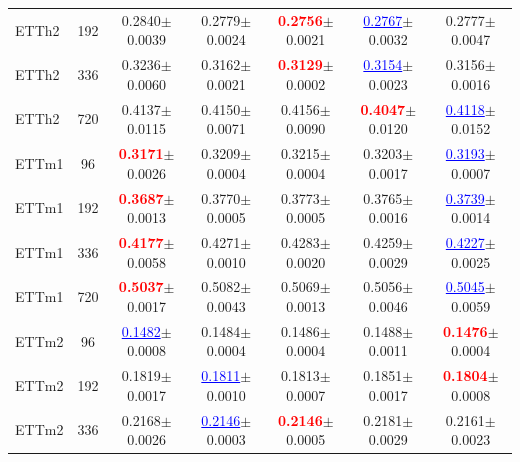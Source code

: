 \begin{table}[h]
\begin{center}
\begin{tabular}{l|c|ccccc}
    ETTh2 & 192 & 0.2840{\scriptsize $\pm$0.0039} & 0.2779{\scriptsize $\pm$0.0024} & \textcolor{red}{\textbf{0.2756}}{\scriptsize $\pm$0.0021} & \textcolor{blue}{\underline{0.2767}}{\scriptsize $\pm$0.0032} & 0.2777{\scriptsize $\pm$0.0047} \\
    ETTh2 & 336 & 0.3236{\scriptsize $\pm$0.0060} & 0.3162{\scriptsize $\pm$0.0021} & \textcolor{red}{\textbf{0.3129}}{\scriptsize $\pm$0.0002} & \textcolor{blue}{\underline{0.3154}}{\scriptsize $\pm$0.0023} & 0.3156{\scriptsize $\pm$0.0016} \\
    ETTh2 & 720 & 0.4137{\scriptsize $\pm$0.0115} & 0.4150{\scriptsize $\pm$0.0071} & 0.4156{\scriptsize $\pm$0.0090} & \textcolor{red}{\textbf{0.4047}}{\scriptsize $\pm$0.0120} & \textcolor{blue}{\underline{0.4118}}{\scriptsize $\pm$0.0152} \\
    \midrule
    ETTm1 & 96  & \textcolor{red}{\textbf{0.3171}}{\scriptsize $\pm$0.0026} & 0.3209{\scriptsize $\pm$0.0004} & 0.3215{\scriptsize $\pm$0.0004} & 0.3203{\scriptsize $\pm$0.0017} & \textcolor{blue}{\underline{0.3193}}{\scriptsize $\pm$0.0007} \\
    ETTm1 & 192 & \textcolor{red}{\textbf{0.3687}}{\scriptsize $\pm$0.0013} & 0.3770{\scriptsize $\pm$0.0005} & 0.3773{\scriptsize $\pm$0.0005} & 0.3765{\scriptsize $\pm$0.0016} & \textcolor{blue}{\underline{0.3739}}{\scriptsize $\pm$0.0014} \\
    ETTm1 & 336 & \textcolor{red}{\textbf{0.4177}}{\scriptsize $\pm$0.0058} & 0.4271{\scriptsize $\pm$0.0010} & 0.4283{\scriptsize $\pm$0.0020} & 0.4259{\scriptsize $\pm$0.0029} & \textcolor{blue}{\underline{0.4227}}{\scriptsize $\pm$0.0025} \\
    ETTm1 & 720 & \textcolor{red}{\textbf{0.5037}}{\scriptsize $\pm$0.0017} & 0.5082{\scriptsize $\pm$0.0043} & 0.5069{\scriptsize $\pm$0.0013} & 0.5056{\scriptsize $\pm$0.0046} & \textcolor{blue}{\underline{0.5045}}{\scriptsize $\pm$0.0059} \\
    \midrule
    ETTm2 & 96  & \textcolor{blue}{\underline{0.1482}}{\scriptsize $\pm$0.0008} & 0.1484{\scriptsize $\pm$0.0004} & 0.1486{\scriptsize $\pm$0.0004} & 0.1488{\scriptsize $\pm$0.0011} & \textcolor{red}{\textbf{0.1476}}{\scriptsize $\pm$0.0004} \\
    ETTm2 & 192 & 0.1819{\scriptsize $\pm$0.0017} & \textcolor{blue}{\underline{0.1811}}{\scriptsize $\pm$0.0010} & 0.1813{\scriptsize $\pm$0.0007} & 0.1851{\scriptsize $\pm$0.0017} & \textcolor{red}{\textbf{0.1804}}{\scriptsize $\pm$0.0008} \\
    ETTm2 & 336 & 0.2168{\scriptsize $\pm$0.0026} & \textcolor{blue}{\underline{0.2146}}{\scriptsize $\pm$0.0003} & \textcolor{red}{\textbf{0.2146}}{\scriptsize $\pm$0.0005} & 0.2181{\scriptsize $\pm$0.0029} & 0.2161{\scriptsize $\pm$0.0023} \\

\end{tabular}
\end{center}
\end{table}
